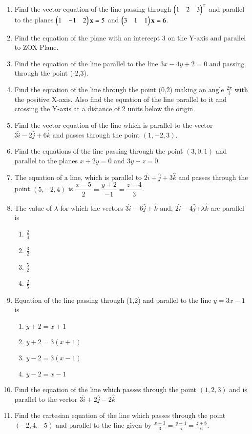 \begin{enumerate}[label=\thesubsection.\arabic*,ref=\thesubsection.\theenumi]
	\item  Find the vector equation of the line passing through $\begin{pmatrix}1&2&3\end{pmatrix}^{\top}$ and parallel to the planes $\begin{pmatrix}1&-1&2\end{pmatrix}\mathbf{x} = 5$ and $\begin{pmatrix}3&1&1\end{pmatrix}\mathbf{x} = 6$.  
		\\
    \solution
		
	\item Find the equation of the plane with an intercept 3 on the Y-axis and parallel to ZOX-Plane.\\
    \solution
		
\item Find the equation of the line  parallel to the line $3x-4y+2=0$ and passing through the point (-2,3).
\label{chapters/11/10/3/7}
\\
\solution 

\item 
	Find the equation of the line through the point (0,2) making an angle $\frac{2\pi}{3}$ with the positive X-axis. Also find the equation of the line parallel to it and crossing the Y-axis at a distance of 2 units below the origin.
	\\
	\solution
\label{chapters/11/10/2/14}

\item  Find the vector equation of the line which is parallel to the vector $3\hat{i}-2\hat{j}+6\hat{k}$ and passes through the point $(1,-2,3)$.
\item Find the equations of the line passing through the point $(3,0,1)$ and parallel to the planes $x+2y=0$ and $3y-z=0.$
\item The equation of a line, which is parallel to $2\hat{i}+\hat{j}+3\hat{k}$ and passes through the point $(5,-2,4)$ is $\dfrac{x-5}{2}=\dfrac{y+2}{-1}=\dfrac{z-4}{3}$.
\item The value of $\lambda$ for which the vectors $3\hat{i}-6\hat{j}+\hat{k}$ $\text{and}$,  $2\hat{i}-4\hat{j}$+$\lambda\hat{k}$ are parallel is
	\begin{enumerate}
			\setlength{\itemsep}{1ex}
\item $\frac{2}{3}$
\item $\frac{3}{2}$
\item $\frac{5}{2}$
\item $\frac{2}{5}$
	\end{enumerate}	
\item Equation of the line passing through (1,2) and parallel to the line $y=3x-1$ is
\begin{enumerate}
\item $y+2=x+1$
\item $y+2=3(x+1)$
\item $y-2=3(x-1)$
\item $y-2=x-1$
\end{enumerate}
\item  Find the equation of the line which passes through the point $(1,2,3)$ and is parallel to the vector $3\hat{i}+2\hat{j}-2\hat{k}$
\item Find the cartesian equation of the line which passes through the point $(-2,4,-5)$ and parallel to the line given by $ \frac{x+3}{3}=\frac{y-4}{5}=\frac{z+8}{6}$.
\end{enumerate}
